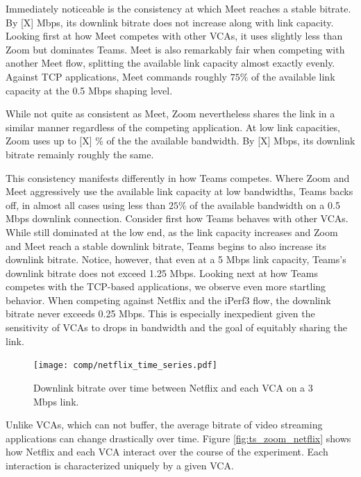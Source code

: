 Immediately noticeable is the consistency at which Meet reaches a stable bitrate. By [X] Mbps, its downlink bitrate does not increase along with link capacity. Looking first at how Meet competes with other VCAs, it uses slightly less than Zoom but dominates Teams. Meet is also remarkably fair when competing with another Meet flow, splitting the available link capacity almost exactly evenly. Against TCP applications, Meet commands roughly $75\%$ of the available link capacity at the 0.5 Mbps shaping level. 

While not quite as consistent as Meet, Zoom nevertheless shares the link in a similar manner regardless of the competing application. At low link capacities, Zoom uses up to [X] \% of the the available bandwidth. By [X] Mbps, its downlink bitrate remainly roughly the same. 


This consistency manifests differently in how Teams competes. 
Where Zoom and Meet aggressively use the available link capacity at low bandwidths, Teams backs off, in almost all cases using less than $25\%$ of the available bandwidth on a 0.5 Mbps downlink connection. Consider first how Teams behaves with other VCAs. While still dominated at the low end, as the link capacity increases and Zoom and Meet reach a stable downlink bitrate, Teams begins to also increase its downlink bitrate. Notice, however, that even at a 5 Mbps link capacity, Teams's downlink bitrate does not exceed 1.25 Mbps. Looking next at how Teams competes with the TCP-based applications, we observe even more startling behavior. When competing against Netflix and the iPerf3 flow, the downlink bitrate never exceeds 0.25 Mbps. This is especially inexpedient given the sensitivity of VCAs to drops in bandwidth and the goal of equitably sharing the link.  

  \begin{figure}[th]
    \texttt{[image: comp/netflix\_time\_series.pdf]}
    \caption{Downlink bitrate over time between Netflix and each VCA on a 3 Mbps link.}
	\label{fig:ts_comp_netflix}
\end{figure}
  
Unlike VCAs, which can not buffer, the average bitrate of video streaming applications can change drastically over time. Figure \ref{fig:ts_zoom_netflix} shows how Netflix and each VCA interact over the course of the experiment. Each interaction is characterized uniquely by a given VCA. 


